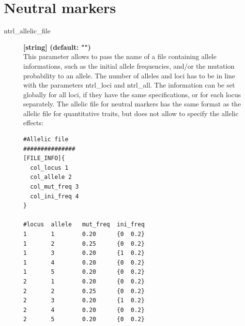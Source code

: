 \documentclass[letterpaper,12pt,oneside]{book}
\begin{document}
\chapter{Neutral markers}\label{chap:ntrl}
\begin{description}
\item[\label{allelicFileNTRL}ntrl\_allelic\_file]  \textbf{[string] (default: "")} \\
This parameter allows to pass the name of a file containing allele informations, such as the initial allele frequencies, and/or the mutation probability to an allele. The number of alleles and loci has to be in line with the parameters \textsf{ntrl\_loci} and \textsf{ntrl\_all}. The information can be set globally for all loci, if they have the same specifications, or for each locus separately. The allelic file for neutral markers has the same format as the allelic file for quantitative traits, but does not allow to specify the allelic effects:

\begin{lstlisting}[frame=single]
#Allelic file 
###############
[FILE_INFO]{
  col_locus 1
  col_allele 2
  col_mut_freq 3
  col_ini_freq 4
}

#locus  allele   mut_freq  ini_freq  
1       1        0.20      {0  0.2}
1       2        0.25      {0  0.2}
1       3        0.20      {1  0.2}
1       4        0.20      {0  0.2}
1       5        0.20      {0  0.2}
2       1        0.20      {0  0.2}
2       2        0.25      {0  0.2}
2       3        0.20      {1  0.2}
2       4        0.20      {0  0.2}
2       5        0.20      {0  0.2}
\end{lstlisting}


\end{description}
\end{document}
